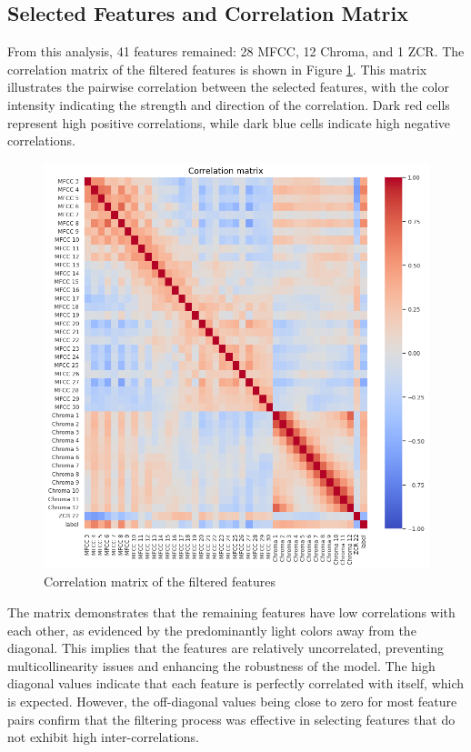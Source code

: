 \subsection{Selected Features and Correlation Matrix}

From this analysis, 41 features remained: 28 MFCC, 12 Chroma, and 1 ZCR. The correlation matrix of the filtered features is shown in Figure \ref{fig:correlation_matrix}. This matrix illustrates the pairwise correlation between the selected features, with the color intensity indicating the strength and direction of the correlation. Dark red cells represent high positive correlations, while dark blue cells indicate high negative correlations.

\begin{figure}[H]
    \centering
    \includegraphics[width=0.8\columnwidth]{../images/correlation_matrix.png}
    \caption{Correlation matrix of the filtered features}
    \label{fig:correlation_matrix}
\end{figure}

The matrix demonstrates that the remaining features have low correlations with each other, as evidenced by the predominantly light colors away from the diagonal. This implies that the features are relatively uncorrelated, preventing multicollinearity issues and enhancing the robustness of the model. The high diagonal values indicate that each feature is perfectly correlated with itself, which is expected. However, the off-diagonal values being close to zero for most feature pairs confirm that the filtering process was effective in selecting features that do not exhibit high inter-correlations.
